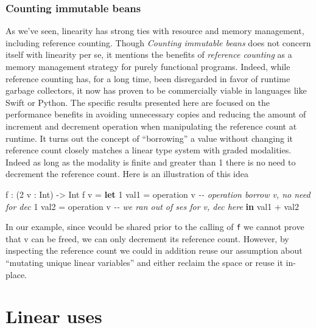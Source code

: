 \documentclass[
]{article}
\newenvironment{Shaded}{}{}
\newcommand{\CommentTok}[1]{\textcolor[rgb]{0.38,0.63,0.69}{\textit{#1}}}
\newcommand{\DataTypeTok}[1]{\textcolor[rgb]{0.56,0.13,0.00}{#1}}
\newcommand{\DecValTok}[1]{\textcolor[rgb]{0.25,0.63,0.44}{#1}}
\newcommand{\KeywordTok}[1]{\textcolor[rgb]{0.00,0.44,0.13}{\textbf{#1}}}
\newcommand{\NormalTok}[1]{#1}
\newcommand{\OperatorTok}[1]{\textcolor[rgb]{0.40,0.40,0.40}{#1}}
\newcommand{\OtherTok}[1]{\textcolor[rgb]{0.00,0.44,0.13}{#1}}
\begin{document}
\hypertarget{counting-immutable-beans}{%
\subsubsection{Counting immutable
beans}\label{counting-immutable-beans}}

As we've seen, linearity has strong ties with resource and memory
management, including reference counting. Though \emph{Counting
immutable beans} does not concern itself with linearity per se, it
mentions the benefits of \emph{reference counting} as a memory
management strategy for purely functional programs. Indeed, while
reference counting has, for a long time, been disregarded in favor of
runtime garbage collectors, it now has proven to be commercially viable
in languages like Swift or Python. The specific results presented here
are focused on the performance benefits in avoiding unnecessary copies
and reducing the amount of increment and decrement operation when
manipulating the reference count at runtime. It turns out the concept of
``borrowing'' a value without changing it reference count closely
matches a linear type system with graded modalities. Indeed as long as
the modality is finite and greater than 1 there is no need to decrement
the reference count. Here is an illustration of this idea

\begin{Shaded}
\begin{Highlighting}[]
\NormalTok{f }\OperatorTok{:}\NormalTok{ (}\DecValTok{2}\NormalTok{ v }\OperatorTok{:} \DataTypeTok{Int}\NormalTok{) }\OtherTok{{-}\textgreater{}} \DataTypeTok{Int}
\NormalTok{f v }\OtherTok{=} \KeywordTok{let} \DecValTok{1}\NormalTok{ val1 }\OtherTok{=}\NormalTok{ operation v }\CommentTok{{-}{-} operation borrow v, no need for dec}
          \DecValTok{1}\NormalTok{ val2 }\OtherTok{=}\NormalTok{ operation v }\CommentTok{{-}{-} we ran out of ses for v, dec here}
       \KeywordTok{in}\NormalTok{ val1 }\OperatorTok{+}\NormalTok{ val2}
\end{Highlighting}
\end{Shaded}

In our example, since \texttt{v}could be shared prior to the calling of
\texttt{f} we cannot prove that v can be freed, we can only decrement
its reference count. However, by inspecting the reference count we could
in addition reuse our assumption about ``mutating unique linear
variables'' and either reclaim the space or reuse it in-place.

\hypertarget{linear-uses}{%
\section{Linear uses}\label{linear-uses}}
\end{document}
